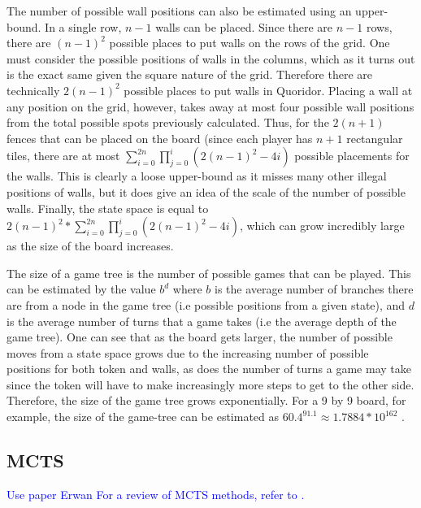 \documentclass[journal, a4paper]{IEEEtran}
\begin{document}
The number of possible wall positions can also be estimated using an upper-bound. In a single row, $n-1$ walls can be placed. Since there are $n-1$ rows, there are $(n-1)^{2}$ possible places to put walls on the rows of the grid. One must consider the possible positions of walls in the columns, which as it turns out is the exact same given the square nature of the grid. Therefore there are technically $2(n-1)^{2}$ possible places to put walls in Quoridor. 
Placing a wall at any position on the grid, however, takes away at most four possible wall positions from the total possible spots previously calculated. Thus, for the $2(n+1)$ fences that can be placed on the board (since each player has $n+1$ rectangular tiles, there are at most $\sum_{i=0}^{2n} \prod_{j=0}^{i}(2(n-1)^2 - 4i)$ possible placements for the walls. This is clearly a loose upper-bound as it misses many other illegal positions of walls, but it does give an idea of the scale of the number of possible walls. Finally, the state space is equal to $2(n-1)^{2} * \sum_{i=0}^{2n} \prod_{j=0}^{i}(2(n-1)^2 - 4i)$, which can grow incredibly large as the size of the board increases.

The size of a game tree is the number of possible games that can be played. This can be estimated by the value $b^{d}$ where $b$ is the average number of branches there are from a node in the game tree (i.e possible positions from a given state), and $d$ is the average number of turns that a game takes (i.e the average depth of the game tree). One can see that as the board gets larger, the number of possible moves from a state space grows due to the increasing number of possible positions for both token and walls, as does the number of turns a game may take since the token will have to make increasingly more steps to get to the other side. 
Therefore, the size of the game tree grows exponentially. For a 9 by 9 board, for example, the size of the game-tree can be estimated as $60.4^{91.1} \approx 1.7884 * 10^{162}$ \cite{mastering-quoridor}.


\subsection{MCTS}
\label{ssec:mcts}
\textcolor{blue}{Use paper Erwan \cite{mc-rave}
For a review of MCTS methods, refer to \cite{mcts-review}.}
\end{document}
